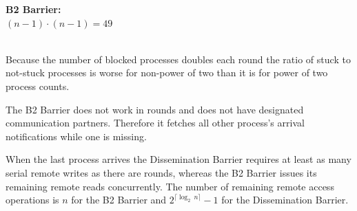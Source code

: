 \documentclass[a4paper, 10pt]{article}
\begin{document}
\begin{table}[htbp]
\begin{minipage}{0.42\linewidth}
{	}
\end{minipage}
\begin{minipage}{0.42\linewidth}
	\vspace{0.3cm}
	\textbf{B2 Barrier:} \\
	$(n-1) \cdot (n-1) = 49$ \\
	\vspace{-0.1cm} \\
\end{minipage}
\label{tab:table-dissemination-progress}
\end{table}

Because the number of blocked processes doubles each round the ratio of stuck to not-stuck processes is worse for non-power of two than it is for power of two process counts.

The B2 Barrier does not work in rounds and does not have designated communication partners. Therefore it fetches all other process's arrival notifications while one is missing.

When the last process arrives the Dissemination Barrier requires at least as many serial remote writes as there are rounds, whereas the B2 Barrier issues its remaining remote reads concurrently. The number of remaining remote access operations is $n$ for the B2 Barrier and $2^{\lceil \log_2~n \rceil} - 1$ for the Dissemination Barrier.
\end{document}
